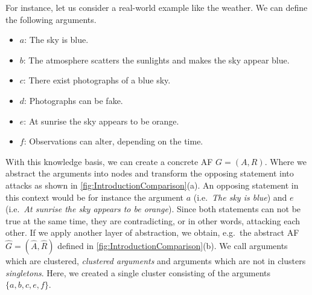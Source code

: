 For instance, let us consider a real-world example like the weather. We can define the following arguments.

\begin{itemize}
    \item $a$: The sky is blue.
    \item $b$: The atmosphere scatters the sunlights and makes the sky appear blue.
    \item $c$: There exist photographs of a blue sky.
    \item $d$: Photographs can be fake.
    \item $e$: At sunrise the sky appears to be orange.
    \item $f$: Observations can alter, depending on the time.
\end{itemize}

With this knowledge basis, we can create a concrete AF $G=(A, R)$. Where we abstract the arguments into nodes and transform the opposing statement into attacks as shown in \cref{fig:IntroductionComparison}(a). An opposing statement in this context would be for instance the argument $a$ (i.e.\ \emph{The sky is blue}) and $e$ (i.e.\ \emph{At sunrise the sky appears to be orange}). Since both statements can not be true at the same time, they are contradicting, or in other words, attacking each other. If we apply another layer of abstraction, we obtain, e.g.\ the abstract AF $\hat{G}=(\hat{A}, \hat{R})$ defined in \cref{fig:IntroductionComparison}(b). We call arguments which are clustered, \emph{clustered arguments} and arguments which are not in clusters \emph{singletons}. Here, we created a single cluster consisting of the arguments $\{a, b, c, e, f\}$.



